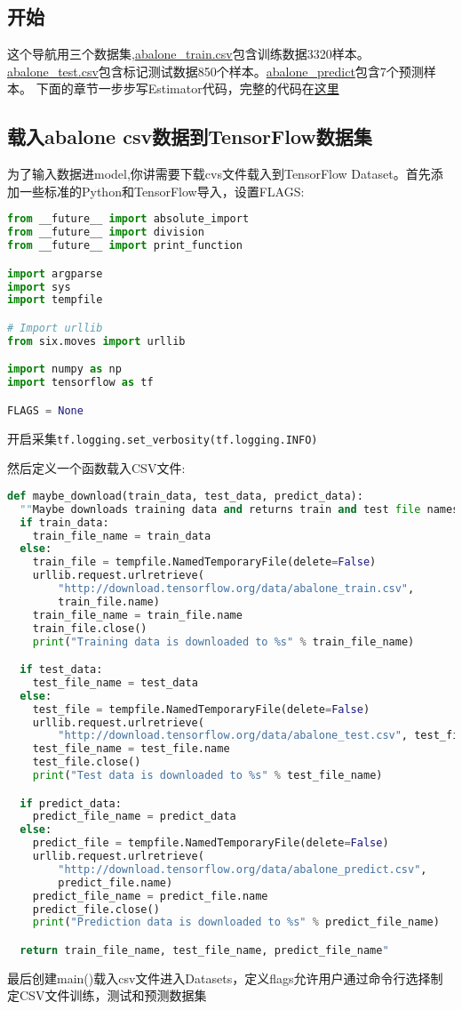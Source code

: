 \subsection{开始}
这个导航用三个数据集,\href{http://download.tensorflow.org/data/abalone_train.csv}{abalone\_train.csv}包含训练数据3320样本。\href{http://download.tensorflow.org/data/abalone_test.csv}{abalone\_test.csv}包含标记测试数据850个样本。\href{http://download.tensorflow.org/data/abalone_predict.csv}{abalone\_predict}包含7个预测样本。
下面的章节一步步写Estimator代码，完整的代码在\href{https://www.github.com/tensorflow/tensorflow/blob/r1.4/tensorflow/examples/tutorials/estimators/abalone.py}{这里}
\subsection{载入abalone csv数据到TensorFlow数据集}
为了输入数据进model,你讲需要下载cvs文件载入到TensorFlow Dataset。首先添加一些标准的Python和TensorFlow导入，设置FLAGS:
\begin{lstlisting}[language=Python]
from __future__ import absolute_import
from __future__ import division
from __future__ import print_function

import argparse
import sys
import tempfile

# Import urllib
from six.moves import urllib

import numpy as np
import tensorflow as tf

FLAGS = None
\end{lstlisting}
开启采集\lstinline[language=Python]{tf.logging.set_verbosity(tf.logging.INFO)}

然后定义一个函数载入CSV文件:
\begin{lstlisting}[language=Python]
def maybe_download(train_data, test_data, predict_data):
  ""Maybe downloads training data and returns train and test file names.""
  if train_data:
    train_file_name = train_data
  else:
    train_file = tempfile.NamedTemporaryFile(delete=False)
    urllib.request.urlretrieve(
        "http://download.tensorflow.org/data/abalone_train.csv",
        train_file.name)
    train_file_name = train_file.name
    train_file.close()
    print("Training data is downloaded to %s" % train_file_name)

  if test_data:
    test_file_name = test_data
  else:
    test_file = tempfile.NamedTemporaryFile(delete=False)
    urllib.request.urlretrieve(
        "http://download.tensorflow.org/data/abalone_test.csv", test_file.name)
    test_file_name = test_file.name
    test_file.close()
    print("Test data is downloaded to %s" % test_file_name)

  if predict_data:
    predict_file_name = predict_data
  else:
    predict_file = tempfile.NamedTemporaryFile(delete=False)
    urllib.request.urlretrieve(
        "http://download.tensorflow.org/data/abalone_predict.csv",
        predict_file.name)
    predict_file_name = predict_file.name
    predict_file.close()
    print("Prediction data is downloaded to %s" % predict_file_name)

  return train_file_name, test_file_name, predict_file_name"
\end{lstlisting}
最后创建main()载入csv文件进入Datasets，定义flags允许用户通过命令行选择制定CSV文件训练，测试和预测数据集

